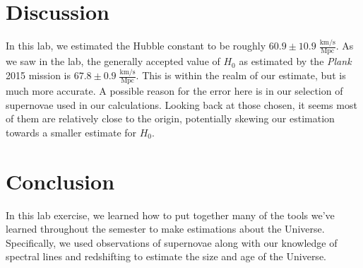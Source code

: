 \documentclass[11pt]{article}
\begin{document}
\section{Discussion}
In this lab, we estimated the Hubble constant to be roughly $60.9 \pm 10.9\;\frac{\textrm{km/s}}{\textrm{Mpc}}$.
As we saw in the lab, the generally accepted value of $H_0$ as estimated by the \textit{Plank} 2015 mission is $67.8 \pm 0.9\;\frac{\textrm{km/s}}{\textrm{Mpc}}$.
This is within the realm of our estimate, but is much more accurate.
A possible reason for the error here is in our selection of supernovae used in our calculations.
Looking back at those chosen, it seems most of them are relatively close to the origin, potentially skewing our estimation towards a smaller estimate for $H_0$.


\section{Conclusion}
In this lab exercise, we learned how to put together many of the tools we've learned throughout the semester to make estimations about the Universe.
Specifically, we used observations of supernovae along with our knowledge of spectral lines and redshifting to estimate the size and age of the Universe.


\printbibliography
\end{document}
